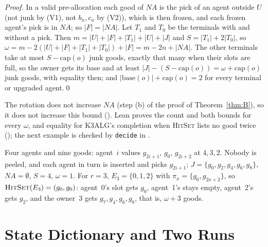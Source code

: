 \documentclass[runningheads,11pt]{llncs}
\newcommand{\NA}{\mathit{NA}}
\newcommand{\capa}{\mathrm{cap}}
\newcommand{\base}{\mathrm{base}}
\begin{document}
\begin{proof}
In a valid pre-allocation each good of $\NA$ is the pick of an agent outside $U$ (not junk by (V1), not $b_u,c_u$ by (V2)), which is then frozen, and each frozen agent's pick is in $\NA$; so $|F|=|\NA|$. Let $T_1$ and $T_0$ be the terminals with and without a pick. Then $m=|U|+|F|+|T_1|+|U|+|J|$ and $S=|T_1|+2|T_0|$, so $\omega=m-2(|U|+|F|+|T_1|+|T_0|)+|F|=m-2n+|\NA|$. The other terminals take at most $S-\capa(o)$ junk goods, exactly that many when their slots are full, so the owner gets its base and at least $|J|-(S-\capa(o))=\omega+\capa(o)$ junk goods, with equality then; and $|\base(o)|+\capa(o)=2$ for every terminal or upgraded agent.\qed
\end{proof}

\noindent The rotation does not increase $\NA$ (step (b) of the proof of Theorem~\ref{thm:B}), so it does not increase this bound (). Lean proves the count and both bounds for every $\omega$, and equality for K3ALG's completion when \textsc{HitSet} lists no good twice (); the next example is checked by \texttt{decide} in .

\begin{example}\label{ex:rep}
Four agents and nine goods: agent~$i$ values $g_{2i+1}$, $g_0$, $g_{2i+2}$ at $4,3,2$. Nobody is peeled, and each agent in turn is inserted and picks $g_{2i+1}$; $J=\{g_0,g_2,g_4,g_6,g_8\}$, $\NA=\emptyset$, $S=4$, $\omega=1$. For $r=3$, $E_3=\{0,1,2\}$ with $\pi_x=\{g_0,g_{2x+2}\}$, so $\textsc{HitSet}(E_3)=(g_0,g_0)$: agent~0's slot gets $g_0$, agent~1's stays empty, agent~2's gets $g_2$, and the owner~3 gets $g_7,g_4,g_6,g_8$, that is, $\omega+3$ goods.
\end{example}

\section{State Dictionary and Two Runs}\label{app:dict}
\end{document}

